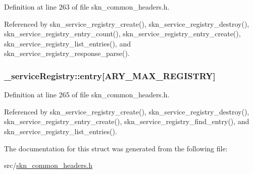 Definition at line 263 of file skn\+\_\+common\+\_\+headers.\+h.



Referenced by skn\+\_\+service\+\_\+registry\+\_\+create(), skn\+\_\+service\+\_\+registry\+\_\+destroy(), skn\+\_\+service\+\_\+registry\+\_\+entry\+\_\+count(), skn\+\_\+service\+\_\+registry\+\_\+entry\+\_\+create(), skn\+\_\+service\+\_\+registry\+\_\+list\+\_\+entries(), and skn\+\_\+service\+\_\+registry\+\_\+response\+\_\+parse().

\hypertarget{struct__service_registry_ad35429e298009925477ba528ea500fe8}{
\subsubsection[{entry}]{ \+\_\+service\+Registry\+::entry\mbox{[}{\bf A\+R\+Y\+\_\+\+M\+A\+X\+\_\+\+R\+E\+G\+I\+S\+T\+R\+Y}\mbox{]}}}\label{struct__service_registry_ad35429e298009925477ba528ea500fe8}


Definition at line 265 of file skn\+\_\+common\+\_\+headers.\+h.



Referenced by skn\+\_\+service\+\_\+registry\+\_\+create(), skn\+\_\+service\+\_\+registry\+\_\+destroy(), skn\+\_\+service\+\_\+registry\+\_\+entry\+\_\+create(), skn\+\_\+service\+\_\+registry\+\_\+find\+\_\+entry(), and skn\+\_\+service\+\_\+registry\+\_\+list\+\_\+entries().



The documentation for this struct was generated from the following file\+:\begin{DoxyCompactItemize}
\item 
src/\hyperlink{skn__common__headers_8h}{skn\+\_\+common\+\_\+headers.\+h}\end{DoxyCompactItemize}
